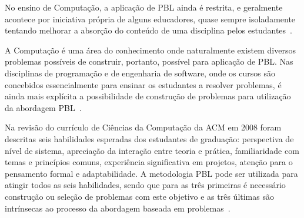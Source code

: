 No ensino de Computação, a aplicação de PBL ainda é restrita, e geralmente
acontece por iniciativa própria de alguns educadores,
quase sempre isoladamente tentando melhorar a
absorção do conteúdo de uma disciplina
pelos estudantes~\cite{wood2003problem, o2012practical}.

A Computação é uma área do conhecimento onde naturalmente existem
diversos problemas possíveis de construir, portanto, possível para
aplicação de PBL.
Nas disciplinas de programação e de engenharia de software, onde os
cursos são concebidos essencialmente para ensinar os estudantes
a resolver problemas, é ainda mais explícita a possibilidade
de construção de problemas para utilização da abordagem
PBL~\cite{fee2010teaching}.

Na revisão do currículo de Ciências da Computação da ACM em 2008
foram descritas seis habilidades esperadas dos estudantes
de graduação: perspectiva de nível de sistema,
apreciação da interação entre teoria e prática,
familiaridade com temas e princípios comuns,
experiência significativa em projetos,
atenção para o pensamento formal e
adaptabilidade.
A metodologia PBL pode ser utilizada para atingir
todos as seis habilidades, sendo que para as três primeiras
é necessário construção ou seleção de problemas com este objetivo e 
as três últimas são intrínsecas ao processo da abordagem baseada
em problemas~\cite{cassel2008computer}.
